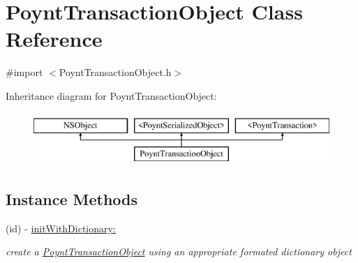 \hypertarget{interface_poynt_transaction_object}{}\section{Poynt\+Transaction\+Object Class Reference}
\label{interface_poynt_transaction_object}


{\ttfamily \#import $<$Poynt\+Transaction\+Object.\+h$>$}

Inheritance diagram for Poynt\+Transaction\+Object\+:\begin{figure}[H]
\begin{center}
\leavevmode
\includegraphics[height=2.000000cm]{interface_poynt_transaction_object}
\end{center}
\end{figure}
\subsection*{Instance Methods}
\begin{DoxyCompactItemize}
\item 
(id) -\/ \hyperlink{interface_poynt_transaction_object_a777cf6da1ae0fc9452b06142a5adaa14}{init\+With\+Dictionary\+:}
\begin{DoxyCompactList}\small\item\em create a \hyperlink{interface_poynt_transaction_object}{Poynt\+Transaction\+Object} using an appropriate formated dictionary object \end{DoxyCompactList}\end{DoxyCompactItemize}
